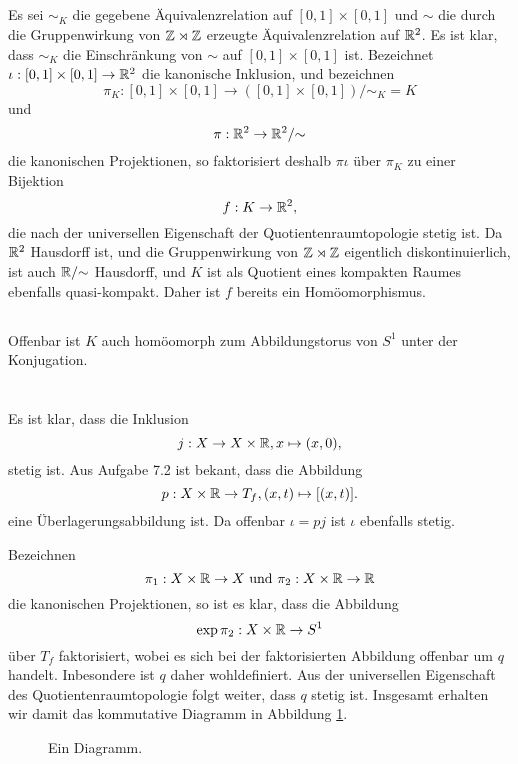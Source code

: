 \documentclass[a4paper,10pt]{article}
\begin{document}
\subsection{}
Es sei $\sim_K$ die gegebene Äquivalenzrelation auf $[0,1] \times [0,1]$ und $\sim$ die durch die Gruppenwirkung von $\mathbb{Z} \rtimes \mathbb{Z}$ erzeugte Äquivalenzrelation auf $\mathbb{R}^2$. Es ist klar, dass $\sim_K$ die Einschränkung von $\sim$ auf $[0,1] \times [0,1]$ ist. Bezeichnet $\iota : [0,1] \times [0,1] \to \mathbb{R}^2$ die kanonische Inklusion, und bezeichnen
\[
 \pi_K : [0,1] \times [0,1] \to ([0,1] \times [0,1])/{\sim_K} = K
\]
und
\[
 \pi : \mathbb{R}^2 \to \mathbb{R}^2 / {\sim}
\]
die kanonischen Projektionen, so faktorisiert deshalb $\pi \iota$ über $\pi_K$ zu einer Bijektion
\[
 f : K \to \mathbb{R}^2,
\]
die nach der universellen Eigenschaft der Quotientenraumtopologie stetig ist. Da $\mathbb{R}^2$ Hausdorff ist, und die Gruppenwirkung von $\mathbb{Z} \rtimes \mathbb{Z}$ eigentlich diskontinuierlich, ist auch $\mathbb{R}/{\sim}$ Hausdorff, und $K$ ist als Quotient eines kompakten Raumes ebenfalls quasi-kompakt. Daher ist $f$ bereits ein Homöomorphismus.


\subsection{}
Offenbar ist $K$ auch homöomorph zum Abbildungstorus von $S^1$ unter der Konjugation.







\section{}
Es ist klar, dass die Inklusion
\[
 j : X \to X \times \mathbb{R}, x \mapsto (x,0),
\]
stetig ist. Aus Aufgabe 7.2 ist bekant, dass die Abbildung
\[
 p : X \times \mathbb{R} \to T_f, (x,t) \mapsto [(x,t)].
\]
eine Überlagerungsabbildung ist. Da offenbar $\iota = pj$ ist $\iota$ ebenfalls stetig.

Bezeichnen
\[
 \pi_1 : X \times \mathbb{R} \to X \text{ und } \pi_2 : X \times \mathbb{R} \to \mathbb{R}
\]
die kanonischen Projektionen, so ist es klar, dass die Abbildung
\[
 \exp \pi_2 : X \times \mathbb{R} \to S^1
\]
über $T_f$ faktorisiert, wobei es sich bei der faktorisierten Abbildung offenbar um $q$ handelt. Inbesondere ist $q$ daher wohldefiniert. Aus der universellen Eigenschaft des Quotientenraumtopologie folgt weiter, dass $q$ stetig ist. Insgesamt erhalten wir damit das kommutative Diagramm in Abbildung \ref{fig: großes Diagramm}.
\begin{figure}\centering
 \caption{Ein Diagramm.}
 \label{fig: großes Diagramm}
\end{figure}
\end{document}
